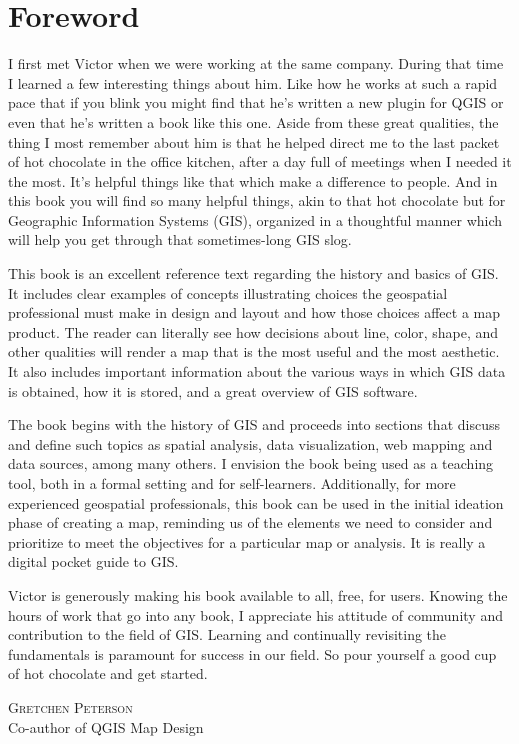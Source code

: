 \chapter*{Foreword}\label{foreword}

I first met Victor when we were working at the same company. During that time I learned a few interesting things about him. Like how he works at such a rapid pace that if you blink you might find that he's written a new plugin for QGIS or even that he's written a book like this one. Aside from these great qualities, the thing I most remember about him is that he helped direct me to the last packet of hot chocolate in the office kitchen, after a day full of meetings when I needed it the most. It's helpful things like that which make a difference to people. And in this book you will find so many helpful things, akin to that hot chocolate but for Geographic Information Systems (GIS), organized in a thoughtful manner which will help you get through that sometimes-long GIS slog.


This book is an excellent reference text regarding the history and basics of GIS. It includes clear examples of concepts illustrating choices the geospatial professional must make in design and layout and how those choices affect a map product. The reader can literally see how decisions about line, color, shape, and other qualities will render a map that is the most useful and the most aesthetic. It also includes important information about the various ways in which GIS data is obtained, how it is stored, and a great overview of GIS software.

The book begins with the history of GIS and proceeds into sections that discuss and define such topics as spatial analysis, data visualization, web mapping and data sources, among many others. I envision the book being used as a teaching tool, both in a formal setting and for self-learners. Additionally, for more experienced geospatial professionals, this book can be used in the initial ideation phase of creating a map, reminding us of the elements we need to consider and prioritize to meet the objectives for a particular map or analysis. It is really a digital pocket guide to GIS.

Victor is generously making his book available to all, free, for users. Knowing the hours of work that go into any book, I appreciate his attitude of community and contribution to the field of GIS. Learning and continually revisiting the fundamentals is paramount for success in our field. So pour yourself a good cup of hot chocolate and get started.  



\begin{flushright}
\textsc{Gretchen Peterson}\\
Co-author of QGIS Map Design
\end{flushright}
